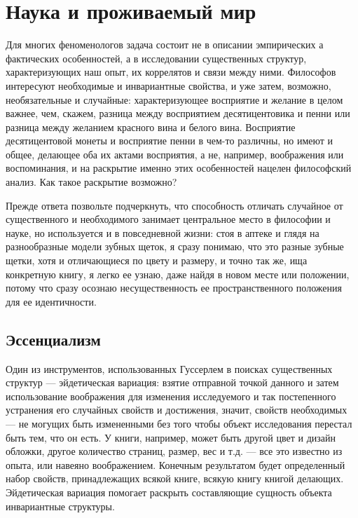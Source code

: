 \documentclass[11pt]{book}
\begin{document}
\chapter{Наука и проживаемый мир}

Для многих феноменологов задача состоит не в описании эмпирических а фактических особенностей, а в исследовании существенных структур, характеризующих наш опыт, их коррелятов и связи между ними. Философов интересуют необходимые и инвариантные свойства, и уже затем, возможно, необязательные и случайные: характеризующее восприятие и желание в целом важнее, чем, скажем, разница между восприятием десятицентовика и пенни или разница между желанием красного вина и белого вина. Восприятие десятицентовой монеты и восприятие пенни в чем-то различны, но имеют и общее, делающее оба их актами восприятия, а не, например, воображения или воспоминания, и на раскрытие именно этих особенностей нацелен философский анализ. Как такое раскрытие возможно?

Прежде ответа позвольте подчеркнуть, что способность отличать случайное от существенного и необходимого занимает центральное место в философии и науке, но используется и в повседневной жизни: стоя в аптеке и глядя на разнообразные модели зубных щеток, я сразу понимаю, что это разные зубные щетки, хотя и отличающиеся по цвету и размеру, и точно так же, ища конкретную книгу, я легко ее узнаю, даже найдя в новом месте или положении, потому что сразу осознаю несущественность ее пространственного положения для ее идентичности.

\section{Эссенциализм}

Один из инструментов, использованных Гуссерлем в поисках существенных структур --- эйдетическая вариация: взятие отправной точкой данного и затем использование воображения для изменения исследуемого и так постепенного устранения его случайных свойств и достижения, значит, свойств необходимых --- не могущих быть измененными без того чтобы объект исследования перестал быть тем, что он есть. У книги, например, может быть другой цвет и дизайн обложки, другое количество страниц, размер, вес и т.д. --- все это известно из опыта, или навеяно воображением. Конечным результатом будет определенный набор свойств, принадлежащих всякой книге, всякую книгу книгой делающих. Эйдетическая вариация помогает раскрыть составляющие сущность объекта инвариантные структуры.
\end{document}

